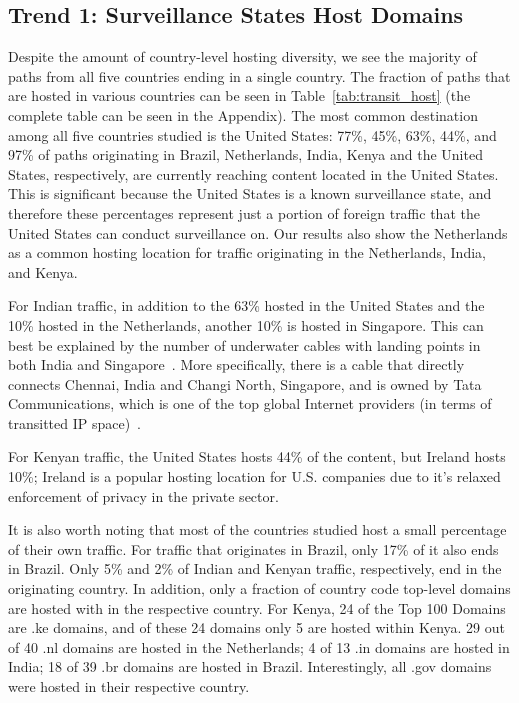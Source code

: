 \subsection{Trend 1: Surveillance States Host Domains}
\label{trend1}
Despite the amount of country-level hosting diversity, we see the majority of paths from all five countries ending in a single country.  The fraction of paths that are hosted in various countries can be seen in Table~\ref{tab:transit_host} (the complete table can be seen in the Appendix).  The most common destination among all five countries studied is the United States: 77\%, 45\%, 63\%, 44\%, and 97\% of paths originating in Brazil, Netherlands, India, Kenya and the United States, respectively, are currently reaching content located in the United States.  This is significant because the United States is a known surveillance state, and therefore these percentages represent just a portion of foreign traffic that the United States can conduct surveillance on.  Our results also show the Netherlands as a common hosting location for traffic originating in the Netherlands, India, and Kenya.

For Indian traffic, in addition to the 63\% hosted in the United States and the 10\% hosted in the Netherlands, another 10\% is hosted in Singapore.  This can best be explained by the number of underwater cables with landing points in both India and Singapore~\cite{cablemap}.  More specifically, there is a cable that directly connects Chennai, India and Changi North, Singapore, and is owned by Tata Communications, which is one of the top global Internet providers (in terms of transitted IP space)~\cite{bakers}.  

For Kenyan traffic, the United States hosts 44\% of the content, but Ireland hosts 10\%; Ireland is a popular hosting location for U.S. companies due to it's relaxed enforcement of privacy in the private sector.  

It is also worth noting that most of the countries studied host a small percentage of their own traffic.  For traffic that originates in Brazil, only 17\% of it also ends in Brazil.  Only 5\% and 2\% of Indian and Kenyan traffic, respectively, end in the originating country.  In addition, only a fraction of country code top-level domains are hosted with in the respective country.  For Kenya, 24 of the Top 100 Domains are .ke domains, and of these 24 domains only 5 are hosted within Kenya.  29 out of 40 .nl domains are hosted in the Netherlands; 4 of 13 .in domains are hosted in India; 18 of 39 .br domains are hosted in Brazil.  Interestingly, all .gov domains were hosted in their respective country.

